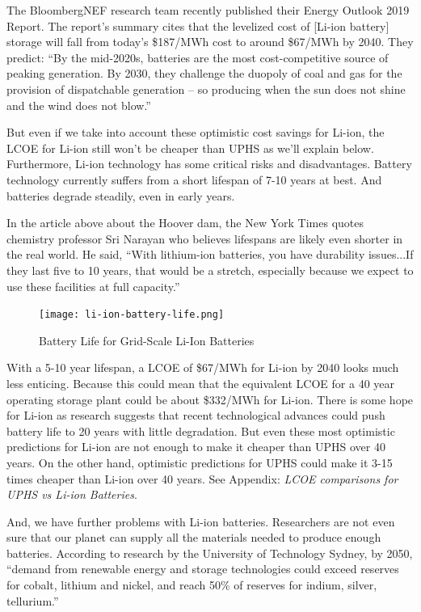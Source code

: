 \documentclass[hidelinks,12pt,a4paper]{article}
\begin{document}
The BloombergNEF research team recently published their Energy Outlook 2019 Report. The report's summary cites that the levelized cost of [Li-ion battery] storage will fall from today's \$187/MWh cost to around \$67/MWh by 2040. \cite{NewEnergyOutlook2019Report} They predict: “By the mid-2020s, batteries are the most cost-competitive source of peaking generation. By 2030, they challenge the duopoly of coal and gas for the provision of dispatchable generation – so producing when the sun does not shine and the wind does not blow.” \cite{NewEnergyOutlook2019Report}

But even if we take into account these optimistic cost savings for Li-ion, the LCOE for Li-ion still won't be cheaper than UPHS as we'll explain below. Furthermore, Li-ion technology has some critical risks and disadvantages. Battery technology currently suffers from a short lifespan of 7-10 years at best. And batteries degrade steadily, even in early years. \cite{LifePredictionModelForLiIonBattery}

In the article above about the Hoover dam, the New York Times quotes chemistry professor Sri Narayan who believes lifespans are likely even shorter in the real world. He said, “With lithium-ion batteries, you have durability issues...If they last five to 10 years, that would be a stretch, especially because we expect to use these facilities at full capacity.” \cite{The3BillionPlanToTurnHooverDamIntoAGiantBattery}

\begin{figure}[ht!]
    \centering
    \texttt{[image: li-ion-battery-life.png]}
    \caption{Battery Life for Grid-Scale Li-Ion Batteries \cite{LifePredictionModelForLiIonBattery}}
\end{figure}
\FloatBarrier

With a 5-10 year lifespan, a LCOE of \$67/MWh for Li-ion by 2040 looks much less enticing. Because this could mean that the equivalent LCOE for a 40 year operating storage plant could be about \$332/MWh for Li-ion. There is some hope for Li-ion as research suggests that recent technological advances could push battery life to 20 years with little degradation. But even these most optimistic predictions for Li-ion are not enough to make it cheaper than UPHS over 40 years. On the other hand, optimistic predictions for UPHS could make it 3-15 times cheaper than Li-ion over 40 years. See Appendix: \textit{LCOE comparisons for UPHS vs Li-ion Batteries}.

And, we have further problems with Li-ion batteries. Researchers are not even sure that our planet can supply all the materials needed to produce enough batteries. According to research by the University of Technology Sydney, by 2050, “demand from renewable energy and storage technologies could exceed reserves for cobalt, lithium and nickel, and reach 50\% of reserves for indium, silver, tellurium.”
\end{document}
